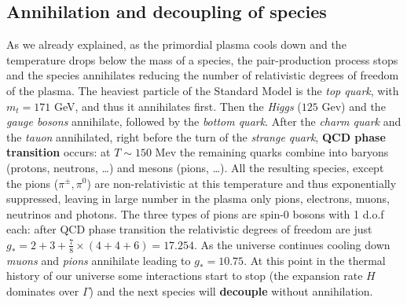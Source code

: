 \subsection{Annihilation and decoupling of species}
\label{sec:decoupling}
As we already explained, as the primordial plasma cools down and the temperature drops below the mass of a species, the pair-production process stops and the species annihilates reducing the number of relativistic degrees of freedom of the plasma.  
The heaviest particle of the Standard Model is the \emph{top quark}, with $m_t=171$ GeV, and thus it annihilates first. Then the \emph{Higgs} ($125$ Gev) and the \emph{gauge bosons} annihilate, followed by the \emph{bottom quark}. After the \emph{charm quark} and the \emph{tauon} annihilated, right before the turn of the \emph{strange quark}, \textbf{QCD phase transition} occurs: at $T\sim 150$ Mev the remaining quarks combine into baryons (protons, neutrons, \dots) and mesons (pions, \dots). All the resulting species, except the pions ($\pi^\pm,\pi^0$) are non-relativistic at this temperature and thus exponentially suppressed, leaving in large number in the plasma only pions, electrons, muons, neutrinos and photons. The three types of pions are spin-0 bosons with 1 d.o.f each: after QCD phase transition the relativistic degrees of freedom are just $g_*=2+3+\tfrac{7}{8}\times(4+4+6)=17.254$. As the universe continues cooling down \emph{muons} and \emph{pions} annihilate leading to $g_*=10.75$. At this point in the thermal history of our universe some interactions start to stop (the expansion rate $H$ dominates over $\Gamma$) and the next species will \textbf{decouple} without annihilation.

